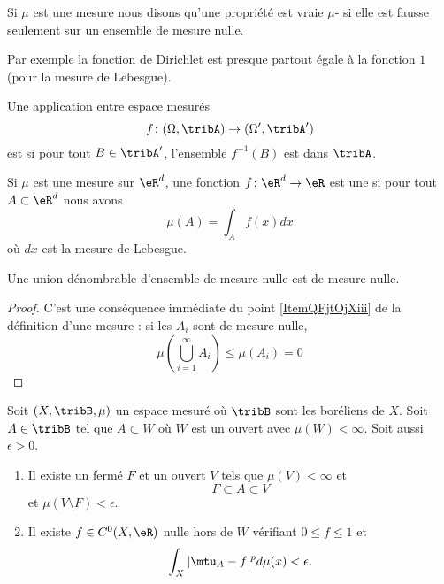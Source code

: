 \begin{definition}
    Si \( \mu\) est une mesure nous disons qu'une propriété est vraie \( \mu\)- si elle est fausse seulement sur un ensemble de mesure nulle.
\end{definition}

Par exemple la fonction de Dirichlet est presque partout égale à la fonction \( 1\) (pour la mesure de Lebesgue).


\begin{definition}
    Une application entre espace mesurés
    \begin{equation}
        f\colon (\Omega,\tribA)\to (\Omega',\tribA')
    \end{equation}
    est  si pour tout \( B\in\tribA'\), l'ensemble \( f^{-1}(B)\) est dans \( \tribA\).
\end{definition}

Si \( \mu\) est une mesure sur \( \eR^d\), une fonction \( f\colon \eR^d\to \eR\) est une  si pour tout \( A\subset\eR^d\) nous avons
\begin{equation}
    \mu(A)=\int_Af(x)dx
\end{equation}
où \( dx\) est la mesure de Lebesgue.

\begin{lemma}   \label{LemIDITgAy}
    Une union dénombrable d'ensemble de mesure nulle est de mesure nulle.
\end{lemma}

\begin{proof}
    C'est une conséquence immédiate du point \ref{ItemQFjtOjXiii} de la définition d'une mesure : si les \( A_i\) sont de mesure nulle,
    \begin{equation}
        \mu\left( \bigcup_{i=1}^{\infty}A_i \right)\leq \mu(A_i)=0
    \end{equation}
\end{proof}

\begin{theorem}     \label{ThoAFXXcVa}
    Soit \( (X,\tribB,\mu)\) un espace mesuré où \( \tribB\) sont les boréliens de \( X\). Soit \( A\in \tribB\) tel que \( A\subset W\) où \( W\) est un ouvert avec \( \mu(W)<\infty\). Soit aussi \( \epsilon>0\).
    \begin{enumerate}
        \item
            Il existe un fermé \( F\) et un ouvert \( V\) tels que \( \mu(V)<\infty\) et
            \begin{equation}
                F\subset A\subset V
            \end{equation}
            et \( \mu(V\setminus F)<\epsilon\).
        \item
            Il existe \( f\in C^0(X,\eR)\) nulle hors de \( W\) vérifiant \( 0\leq f\leq 1\) et
            \begin{equation}
                \int_X| \mtu_A-f |^pd\mu(x)<\epsilon.
            \end{equation}
    \end{enumerate}
\end{theorem}

